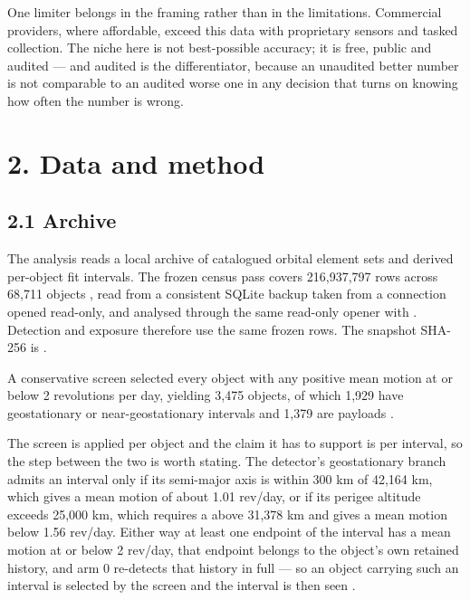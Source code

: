 \documentclass[11pt]{article}
\begin{document}
One limiter belongs in the framing rather than in the limitations. Commercial providers, where affordable, exceed this data with proprietary sensors and tasked collection. The niche here is not best-possible accuracy; it is free, public and audited --- and audited is the differentiator, because an unaudited better number is not comparable to an audited worse one in any decision that turns on knowing how often the number is wrong.

\section*{2. Data and method}

\subsection*{2.1 Archive}

The analysis reads a local archive of catalogued orbital element sets and derived per-object fit intervals. The frozen census pass covers 216,937,797 rows across 68,711 objects%
, read from a consistent SQLite backup taken from a connection opened read-only, and analysed through the same read-only opener with %
. Detection and exposure therefore use the same frozen rows. The snapshot SHA-256 is %
.

A conservative screen selected every object with any positive mean motion at or below 2 revolutions per day, yielding 3,475 objects, of which 1,929 have geostationary or near-geostationary intervals and 1,379 are payloads%
.

The screen is applied per object and the claim it has to support is per interval, so the step between the two is worth stating. The detector's geostationary branch admits an interval only if its semi-major axis is within 300 km of 42,164 km, which gives a mean motion of about 1.01 rev/day, or if its perigee altitude exceeds 25,000 km, which requires a above 31,378 km and gives a mean motion below 1.56 rev/day. Either way at least one endpoint of the interval has a mean motion at or below 2 rev/day, that endpoint belongs to the object's own retained history, and arm 0 re-detects that history in full --- so an object carrying such an interval is selected by the screen and the interval is then seen%
.
\end{document}
